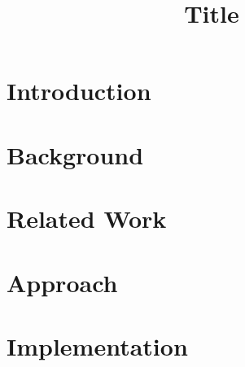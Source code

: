 \documentclass[sigconf]{acmart}
\begin{document}
\title{Title}

\begin{abstract}
\end{abstract}

\maketitle

\glsresetall

\section{Introduction}


\section{Background}


\section{Related Work}


\section{Approach}


\section{Implementation}
\end{document}
